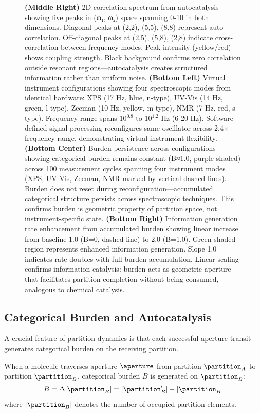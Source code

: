 \begin{figure}[htbp]
{    \textbf{(Middle Right)} 2D correlation spectrum from autocatalysis showing five peaks in (ω₁, ω₂) space spanning 0-10 in both dimensions. Diagonal peaks at (2,2), (5,5), (8,8) represent auto-correlation. Off-diagonal peaks at (2,5), (5,8), (2,8) indicate cross-correlation between frequency modes. Peak intensity (yellow/red) shows coupling strength. Black background confirms zero correlation outside resonant regions—autocatalysis creates structured information rather than uniform noise. 
    \textbf{(Bottom Left)} Virtual instrument configurations showing four spectroscopic modes from identical hardware: XPS (17 Hz, blue, n-type), UV-Vis (14 Hz, green, l-type), Zeeman (10 Hz, yellow, m-type), NMR (7 Hz, red, s-type). Frequency range spans 10$^{0.8}$ to 10$^{1.2}$ Hz (6-20 Hz). Software-defined signal processing reconfigures same oscillator across 2.4× frequency range, demonstrating virtual instrument flexibility. 
    \textbf{(Bottom Center)} Burden persistence across configurations showing categorical burden remains constant (B≈1.0, purple shaded) across 100 measurement cycles spanning four instrument modes (XPS, UV-Vis, Zeeman, NMR marked by vertical dashed lines). Burden does not reset during reconfiguration—accumulated categorical structure persists across spectroscopic techniques. This confirms burden is geometric property of partition space, not instrument-specific state. 
    \textbf{(Bottom Right)} Information generation rate enhancement from accumulated burden showing linear increase from baseline 1.0 (B=0, dashed line) to 2.0 (B=1.0). Green shaded region represents enhanced information generation. Slope 1.0 indicates rate doubles with full burden accumulation. Linear scaling confirms information catalysis: burden acts as geometric aperture that facilitates partition completion without being consumed, analogous to chemical catalysis.}
    \label{fig:autocatalytic_dynamics}
\end{figure}

\subsection{Categorical Burden and Autocatalysis}

A crucial feature of partition dynamics is that each successful aperture transit generates categorical burden on the receiving partition.

\begin{definition}
\label{def:burden}
When a molecule traverses aperture $\aperture$ from partition $\partition_A$ to partition $\partition_B$, categorical burden $B$ is generated on $\partition_B$:
\begin{equation}
B = \Delta|\partition_B| = |\partition_B'| - |\partition_B|
\end{equation}
where $|\partition_B|$ denotes the number of occupied partition elements.
\end{definition}

